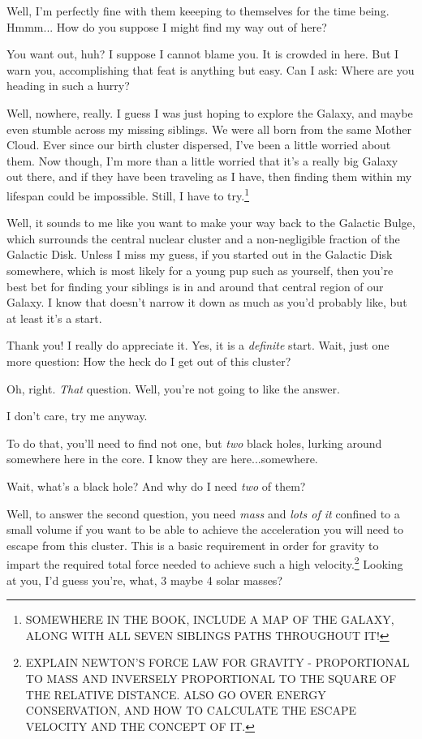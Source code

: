 \documentclass[main.tex]{subfiles}
\begin{document}
\newpara \Sterope Well, I'm perfectly fine with them keeeping to themselves for the time being.  Hmmm... How do you suppose I might find my way out of here?

\newpara \Enrico You want out, huh?  I suppose I cannot blame you.  It is crowded in here.  But I warn you, accomplishing that feat is anything but easy.  Can I ask:  Where are you heading in such a hurry?

\newpara \Sterope Well, nowhere, really.  I guess I was just hoping to explore the Galaxy, and maybe even stumble across my missing siblings.  We were all born from the same Mother Cloud.  Ever since our birth cluster dispersed, I've been a little worried about them.  Now though, I'm more than a little worried that it's a really big Galaxy out there, and if they have been traveling as I have, then finding them within my lifespan could be impossible.  Still, I have to try.\footnote{SOMEWHERE IN THE BOOK, INCLUDE A MAP OF THE GALAXY, ALONG WITH ALL SEVEN SIBLINGS PATHS THROUGHOUT IT!}

\newpara \Enrico Well, it sounds to me like you want to make your way back to the Galactic Bulge, which surrounds the central nuclear cluster and a non-negligible fraction of the Galactic Disk.  Unless I miss my guess, if you started out in the Galactic Disk somewhere, which is most likely for a young pup such as yourself, then you're best bet for finding your siblings is in and around that central region of our Galaxy.  I know that doesn't narrow it down as much as you'd probably like, but at least it's a start.

\newpara \Sterope Thank you!  I really do appreciate it.  Yes, it is a \textit{definite} start.  Wait, just one more question:  How the heck do I get out of this cluster?

\newpara \Enrico Oh, right.  \textit{That} question.  Well, you're not going to like the answer.

\newpara \Sterope I don't care, try me anyway.

\newpara \Enrico To do that, you'll need to find not one, but \textit{two} black holes, lurking around somewhere here in the core.  I know they are here...somewhere.  

\newpara \Sterope Wait, what's a black hole?  And why do I need \textit{two} of them?

\newpara \Enrico Well, to answer the second question, you need \textit{mass} and \textit{lots of it} confined to a small volume if you want to be able to achieve the acceleration you will need to escape from this cluster.  This is a basic requirement in order for gravity to impart the required total force needed to achieve such a high velocity.\footnote{EXPLAIN NEWTON'S FORCE LAW FOR GRAVITY - PROPORTIONAL TO MASS AND INVERSELY PROPORTIONAL TO THE SQUARE OF THE RELATIVE DISTANCE.  ALSO GO OVER ENERGY CONSERVATION, AND HOW TO CALCULATE THE ESCAPE VELOCITY AND THE CONCEPT OF IT.} Looking at you, I'd guess you're, what, 3 maybe 4 solar masses?
\end{document}

